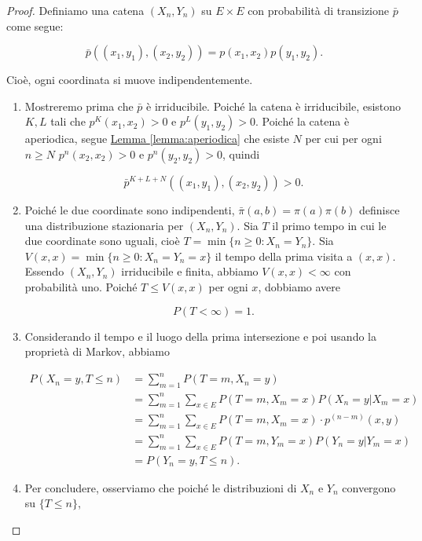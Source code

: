 \documentclass{article}
\begin{document}
\begin{proof}
    Definiamo una catena $(X_n,Y_n)$ su $E \times E$ con probabilità di transizione $\bar{p}$ come segue:

$$\bar{p}((x_1, y_1), (x_2, y_2)) = p(x_1, x_2) p(y_1, y_2).$$

Cioè, ogni coordinata si muove indipendentemente.

\begin{enumerate}
    \item  Mostreremo prima che $\bar{p}$ è irriducibile. Poiché la catena è irriducibile, esistono $K, L$ tali che $p^K(x_1, x_2) > 0$ e $p^L(y_1, y_2) > 0$. Poiché la catena è aperiodica, segue \hyperref[lemma:aperiodica]{Lemma \ref*{lemma:aperiodica}} che esiste $N$ per cui per ogni $n \geq N$ $p^{n}(x_2, x_2) > 0$ e $p^{n}(y_2, y_2) > 0$, quindi

    $$\bar{p}^{K+L+N}((x_1, y_1), (x_2, y_2)) > 0.$$

    \item  Poiché le due coordinate sono indipendenti, $\bar{\pi}(a, b) = \pi(a) \pi(b)$ definisce una distribuzione stazionaria per $(X_n,Y_n)$. Sia $T$ il primo tempo in cui le due coordinate sono uguali, cioè $T = \min\{n \geq 0 : X_n = Y_n\}$. Sia $V(x,x) = \min\{n \geq 0 : X_n = Y_n = x\}$ il tempo della prima visita a $(x, x)$. Essendo $(X_n,Y_n)$ irriducibile e finita, abbiamo $V(x,x) < \infty$ con probabilità uno. Poiché $T \leq V(x,x)$ per ogni $x$, dobbiamo avere

    $$P(T < \infty) = 1.$$

    \item Considerando il tempo e il luogo della prima intersezione e poi usando la proprietà di Markov, abbiamo

    \[
        \begin{split}   
           P(X_n = y, T \leq n) 
            & = \sum_{m=1}^{n} P(T = m, X_n = y) \\
            & = \sum_{m=1}^{n} \sum_{x \in E} P(T = m, X_m = x) P(X_n = y | X_m = x) \\ 
            & = \sum_{m=1}^{n} \sum_{x \in E} P(T = m, X_m = x) \cdot p^{(n-m)}(x,y) \\ 
            & = \sum_{m=1}^{n} \sum_{x \in E} P(T = m, Y_m = x) P(Y_n = y | Y_m = x) \\
            & = P(Y_n=y, T\leq n).
        \end{split}
    \]

    \item Per concludere, osserviamo che poiché le distribuzioni di $X_n$ e $Y_n$ convergono su $\{T \leq n\}$,


\end{enumerate}
\end{proof}
\end{document}
